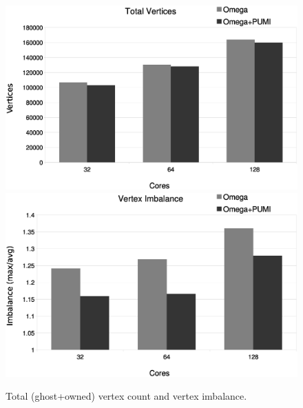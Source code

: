 \documentclass[a4paper]{article}
\begin{document}
\begin{figure}[ht]
\centering
  \includegraphics[width=\textwidth]{total-vtx.eps} \\
  \includegraphics[width=\textwidth]{vtx-imb.eps} \\
  \caption{\label{fig:vtx} Total (ghost+owned) vertex count and vertex imbalance.}
\end{figure}
\end{document}
